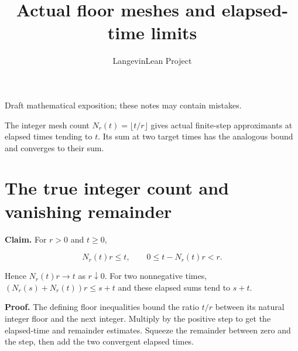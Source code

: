 \documentclass[11pt,a4paper]{article}
\title{\texorpdfstring{Actual floor meshes and elapsed-time limits}{Actual floor meshes and elapsed-time limits}}
\author{LangevinLean Project}
\date{}
\begin{document}
\maketitle
Draft mathematical exposition; these notes may contain mistakes.


The integer mesh count \(N_r(t)=\lfloor t/r\rfloor\) gives actual finite-step approximants at elapsed times tending to \(t\). Its sum at two target times has the analogous bound and converges to their sum.


\section{\texorpdfstring{The true integer count and vanishing remainder}{The true integer count and vanishing remainder}}


\textbf{Claim.} For \(r>0\) and \(t\ge0\),

\[N_r(t)r\le t,\qquad 0\le t-N_r(t)r<r.\]

Hence \(N_r(t)r\to t\) as \(r\downarrow0\). For two nonnegative times, \((N_r(s)+N_r(t))r\le s+t\) and these elapsed sums tend to \(s+t\).



\textbf{Proof.} The defining floor inequalities bound the ratio \(t/r\) between its natural integer floor and the next integer. Multiply by the positive step to get the elapsed-time and remainder estimates. Squeeze the remainder between zero and the step, then add the two convergent elapsed times.
\end{document}

